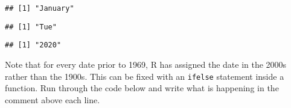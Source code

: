 \documentclass[]{article}
\newenvironment{Shaded}{\begin{snugshade}}{\end{snugshade}}
\newcommand{\CommentTok}[1]{\textcolor[rgb]{0.56,0.35,0.01}{\textit{#1}}}
\newcommand{\DataTypeTok}[1]{\textcolor[rgb]{0.13,0.29,0.53}{#1}}
\newcommand{\KeywordTok}[1]{\textcolor[rgb]{0.13,0.29,0.53}{\textbf{#1}}}
\newcommand{\NormalTok}[1]{#1}
\newcommand{\OperatorTok}[1]{\textcolor[rgb]{0.81,0.36,0.00}{\textbf{#1}}}
\newcommand{\StringTok}[1]{\textcolor[rgb]{0.31,0.60,0.02}{#1}}
\begin{document}
\begin{verbatim}
## [1] "January"
\end{verbatim}

\begin{Shaded}
\end{Shaded}

\begin{verbatim}
## [1] "Tue"
\end{verbatim}

\begin{Shaded}
\end{Shaded}

\begin{verbatim}
## [1] "2020"
\end{verbatim}

\begin{Shaded}
\end{Shaded}

Note that for every date prior to 1969, R has assigned the date in the
2000s rather than the 1900s. This can be fixed with an \texttt{ifelse}
statement inside a function. Run through the code below and write what
is happening in the comment above each line.
\end{document}
